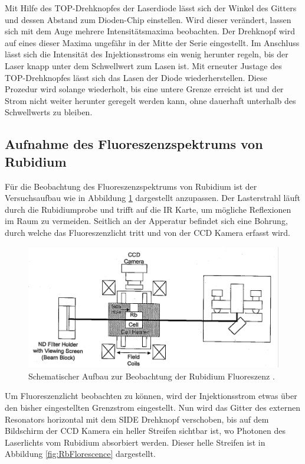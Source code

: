 Mit Hilfe des TOP-Drehknopfes der Laserdiode lässt sich der Winkel des Gitters und
dessen Abstand zum Dioden-Chip einstellen.
Wird dieser verändert, lassen sich mit dem Auge mehrere Intensitätsmaxima beobachten.
Der Drehknopf wird auf eines dieser Maxima ungefähr in der Mitte der Serie eingestellt.
Im Anschluss lässt sich die Intensität des Injektionsstroms ein wenig herunter regeln,
bis der Laser knapp unter dem Schwellwert zum Lasen ist.
Mit erneuter Justage des TOP-Drehknopfes lässt sich das Lasen der Diode wiederherstellen.
Diese Prozedur wird solange wiederholt, bis eine untere Grenze erreicht ist und der
Strom nicht weiter herunter geregelt werden kann, ohne dauerhaft unterhalb des
Schwellwerts zu bleiben.


\subsection{Aufnahme des Fluoreszenzspektrums von Rubidium}
\label{sec:Rb-Fluoreszenz}

Für die Beobachtung des Fluoreszenzspektrums von Rubidium ist der Versuchsaufbau
wie in Abbildung \ref{fig:RbFlorescenceSetup} dargestellt anzupassen.
Der Lasterstrahl läuft durch die Rubidiumprobe und trifft auf die IR Karte,
um mögliche Reflexionen im Raum zu vermeiden.
Seitlich an der Apperatur befindet sich eine Bohrung, durch welche das
Fluoreszenzlicht tritt und von der CCD Kamera erfasst wird.

\begin{figure}
	\centering
	\includegraphics[width=.8\textwidth, angle=1, origin=c]{images/RbFlorescenceSetup.pdf}
	\caption{Schematischer Aufbau zur Beobachtung der Rubidium Fluoreszenz \cite{anleitung}.}
	\label{fig:RbFlorescenceSetup}
\end{figure}

Um Fluoreszenzlicht beobachten zu können, wird der Injektionsstrom etwas über den
bisher eingestellten Grenzstrom eingestellt.
Nun wird das Gitter des externen Resonators horizontal mit dem SIDE Drehknopf
verschoben, bis auf dem Bildschirm der CCD Kamera ein heller Streifen sichtbar ist,
wo Photonen des Laserlichts vom Rubidium absorbiert werden.
Dieser helle Streifen ist in Abbildung \ref{fig:RbFlorescence} dargestellt.

